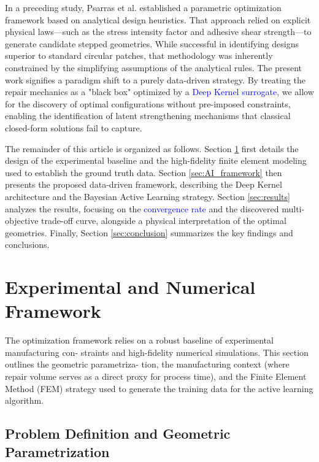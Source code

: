 \documentclass[
  preprint,
  12pt,
  a4paper
]{elsarticle}
\newcommand{\new}[1]{\textcolor{blue}{#1}}
\begin{document}
In a preceding study, Psarras et al. \cite{psarras2024design} established a parametric optimization framework based on analytical design heuristics. That approach relied on explicit physical laws—such as the stress intensity factor and adhesive shear strength—to generate candidate stepped geometries. While successful in identifying designs superior to standard circular patches, that methodology was inherently constrained by the simplifying assumptions of the analytical rules. The present work signifies a paradigm shift to a purely data-driven strategy. By treating the repair mechanics as a "black box" optimized by a \new{Deep Kernel surrogate}, we allow for the discovery of optimal configurations without pre-imposed constraints, enabling the identification of latent strengthening mechanisms that classical closed-form solutions fail to capture.

The remainder of this article is organized as follows. Section \ref{sec:methodology} first details the design of the experimental baseline and the high-fidelity finite element modeling used to establish the ground truth data. Section \ref{sec:AI_framework} then presents the proposed data-driven framework, describing the Deep Kernel architecture and the Bayesian Active Learning strategy. Section \ref{sec:results} analyzes the results, focusing on the \new{convergence rate} and the discovered multi-objective trade-off curve, alongside a physical interpretation of the optimal geometries. Finally, Section \ref{sec:conclusion} summarizes the key findings and conclusions.


\section{Experimental and Numerical Framework}
\label{sec:methodology}
The optimization framework relies on a robust baseline of experimental manufacturing con- straints and high-fidelity numerical simulations. This section outlines the geometric parametriza- tion, the manufacturing context (where repair volume serves as a direct proxy for process time), and the Finite Element Method (FEM) strategy used to generate the training data for the active learning algorithm.

\subsection{Problem Definition and Geometric Parametrization}
\end{document}
